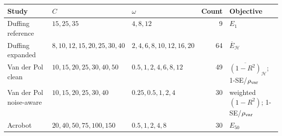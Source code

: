 \begin{tabular}{lp{0.25\linewidth}p{0.21\linewidth}rp{0.19\linewidth}}
\toprule
Study & $C$ & $\omega$ & Count & Objective \\
\midrule
Duffing reference & $15,25,35$ & $4,8,12$ & 9 & $E_1$ \\
Duffing expanded & $8,10,12,15,20,25,30,40$ & $2,4,6,8,10,12,16,20$ & 64 & $\overline E_{\mathcal H}$ \\
Van der Pol clean & $10,15,20,25,30,40,50$ & $0.5,1,2,4,6,8,12$ & 49 & $\overline{(1-R^2)}_{\mathcal H}$; 1-SE/$\rho_{\rm var}$ \\
Van der Pol noise-aware & $10,15,20,25,30,40$ & $0.25,0.5,1,2,4$ & 30 & weighted $(1-R^2)$; 1-SE/$\rho_{\rm var}$ \\
Acrobot & $20,40,50,75,100,150$ & $0.5,1,2,4,8$ & 30 & $E_{50}$ \\
\bottomrule
\end{tabular}
